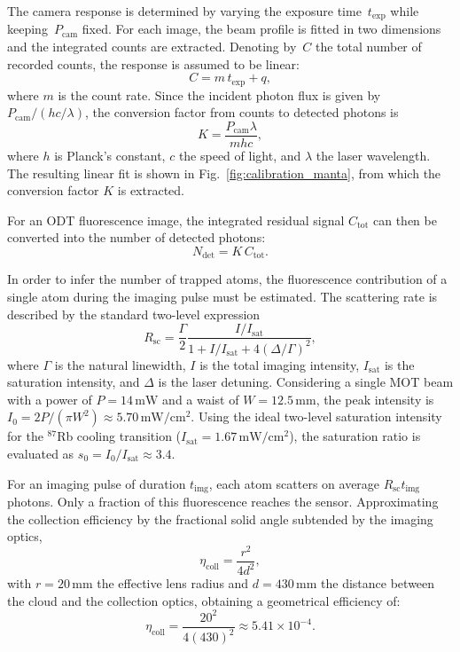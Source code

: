     The camera response is determined by varying the exposure time~$t_{\mathrm{exp}}$ while keeping~$P_{\mathrm{cam}}$ fixed. For each image, the beam profile is fitted in two dimensions and the integrated counts are extracted. Denoting by~$C$ the total number of recorded counts, the response is assumed to be linear:
\begin{equation}
    C = m\,t_{\mathrm{exp}} + q,
\end{equation}
where $m$ is the count rate. Since the incident photon flux is given by $P_{\mathrm{cam}}/(hc/\lambda)$, the conversion factor from counts to detected photons is
\begin{equation}
    K = \frac{P_{\mathrm{cam}}\lambda}{m h c},
\end{equation}
where $h$ is Planck's constant, $c$ the speed of light, and $\lambda$ the laser wavelength. The resulting linear fit is shown in Fig.~\ref{fig:calibration_manta}, from which the conversion factor $K$ is extracted.

For an ODT fluorescence image, the integrated residual signal $C_{\mathrm{tot}}$ can then be converted into the number of detected photons:
\begin{equation}
    N_{\mathrm{det}} = K\,C_{\mathrm{tot}}.
\end{equation}

In order to infer the number of trapped atoms, the fluorescence contribution of a single atom during the imaging pulse must be estimated. The scattering rate is described by the standard two-level expression
\begin{equation}
    R_{\mathrm{sc}} =
    \frac{\Gamma}{2}
    \frac{I/I_{\mathrm{sat}}}{1 + I/I_{\mathrm{sat}} + 4(\Delta/\Gamma)^2},
\end{equation}
where $\Gamma$ is the natural linewidth, $I$ is the total imaging intensity, $I_{\mathrm{sat}}$ is the saturation intensity, and $\Delta$ is the laser detuning. Considering a single MOT beam with a power of $P = 14\,\mathrm{mW}$ and a waist of $W = 12.5\,\mathrm{mm}$, the peak intensity is $I_0 = 2P/(\pi W^2) \approx 5.70\,\mathrm{mW/cm^2}$. Using the ideal two-level saturation intensity for the $^{87}$Rb cooling transition ($I_{\mathrm{sat}} = 1.67\,\mathrm{mW/cm^2}$), the saturation ratio is evaluated as $s_0 = I_0/I_{\mathrm{sat}} \approx 3.4$.

For an imaging pulse of duration $t_{\mathrm{img}}$, each atom scatters on average $R_{\mathrm{sc}} t_{\mathrm{img}}$ photons. Only a fraction of this fluorescence reaches the sensor. Approximating the collection efficiency by the fractional solid angle subtended by the imaging optics,
\begin{equation}
    \eta_{\mathrm{coll}} = \frac{r^2}{4d^2},
\end{equation}
with $r = 20\,\mathrm{mm}$ the effective lens radius and $d = 430\,\mathrm{mm}$ the distance between the cloud and the collection optics, obtaining a geometrical efficiency of:
\begin{equation}
    \eta_{\mathrm{coll}} = \frac{20^2}{4(430)^2} \approx 5.41 \times 10^{-4}.
\end{equation}

